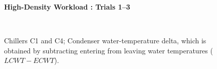 \documentclass{report}
\begin{document}
\begin{figure}[!h]
\centerline{\bfseries\large High-Density Workload : Trials 1--3}\\
\caption{Chillers C1 and C4; Condenser water-temperature delta, which is obtained by subtracting entering from leaving water temperatures ($LCWT-ECWT$).}
\end{figure}
\end{document}
